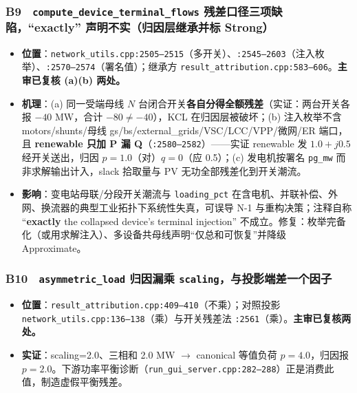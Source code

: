 \documentclass[11pt,a4paper,fontset=fandol]{ctexart}
\newcommand{\file}[1]{\texttt{#1}}
\begin{document}
\subsubsection*{B9　\texttt{compute\_device\_terminal\_flows} 残差口径三项缺陷，``exactly'' 声明不实（归因层继承并标 Strong）}
\begin{itemize}
  \item \textbf{位置}：\file{network\_utils.cpp:2505--2515}（多开关）、\file{:2545--2603}（注入枚举）、\file{:2570--2574}（署名值）；继承方 \file{result\_attribution.cpp:583--606}。\textbf{主审已复核 (a)(b) 两处。}
  \item \textbf{机理}：(a) 同一受端母线 $N$ 台闭合开关\textbf{各自分得全额残差}（实证：两台开关各报 $-40$ MW，合计 $-80\neq-40$），KCL 在归因层被破坏；(b) 注入枚举不含 motors/shunts/母线 gs/bs/external\_grids/VSC/LCC/VPP/微网/ER 端口，且 \textbf{renewable 只加 P 漏 Q}（\file{:2580--2582}）——实证 renewable 发 $1.0+j0.5$ 经开关送出，归因 $p=1.0$（对）$q=0$（应 0.5）；(c) 发电机按署名 \texttt{pg\_mw} 而非求解输出计入，slack 拾取量与 PV 无功全部残差化到开关潮流。
  \item \textbf{影响}：变电站母联/分段开关潮流与 \texttt{loading\_pct} 在含电机、并联补偿、外网、换流器的典型工业拓扑下系统性失真，可误导 N-1 与重构决策；注释自称 ``\textbf{exactly} the collapsed device's terminal injection'' 不成立。修复：枚举完备化（或用求解注入）、多设备共母线声明``仅总和可恢复''并降级 Approximate。
\end{itemize}

\subsubsection*{B10　\texttt{asymmetric\_load} 归因漏乘 \texttt{scaling}，与投影端差一个因子}
\begin{itemize}
  \item \textbf{位置}：\file{result\_attribution.cpp:409--410}（不乘）；对照投影 \file{network\_utils.cpp:136--138}（乘）与开关残差法 \file{:2561}（乘）。\textbf{主审已复核两处。}
  \item \textbf{实证}：scaling=2.0、三相和 2.0 MW $\to$ canonical 等值负荷 $p=4.0$，归因报 $p=2.0$。下游功率平衡诊断（\file{run\_gui\_server.cpp:282--288}）正是消费此值，制造虚假平衡残差。
\end{itemize}
\end{document}
